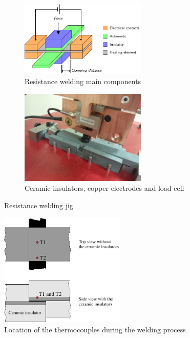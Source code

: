 \documentclass[11pt,review,times]{elsarticle}
\begin{document}
\begin{figure}[htb]
	\centering
	\captionsetup{width=125mm}
	\begin{subfigure}{60mm}
		\centering
		\captionsetup{width=60mm}
		\includegraphics[width=60mm]{beamer_IC3_DBrassard-figure1.pdf}
		\caption{Resistance welding main components \cite{Brassard2018_welding_schematic}}
		\label{fig:welding_jig_schematic}
	\end{subfigure}
	\begin{subfigure}{60mm}
		\centering
		\captionsetup{width=60mm}
		\includegraphics[width=60mm]{20161026_152818_resize.jpg}
		\caption{Ceramic insulators, copper electrodes and load cell}
		\label{fig:welding_jig_electrodes}
	\end{subfigure}%
	\caption{Resistance welding jig}
	\label{fig:welding_jig}
\end{figure}

\begin{figure}
		\center
		\captionsetup{width=60mm}
		\includegraphics[width=60mm]{thermocouple_welding}
		\caption{Location of the thermocouples during the welding process}
		\label{fig:location_thermocouple}
\end{figure} 
\end{document}

